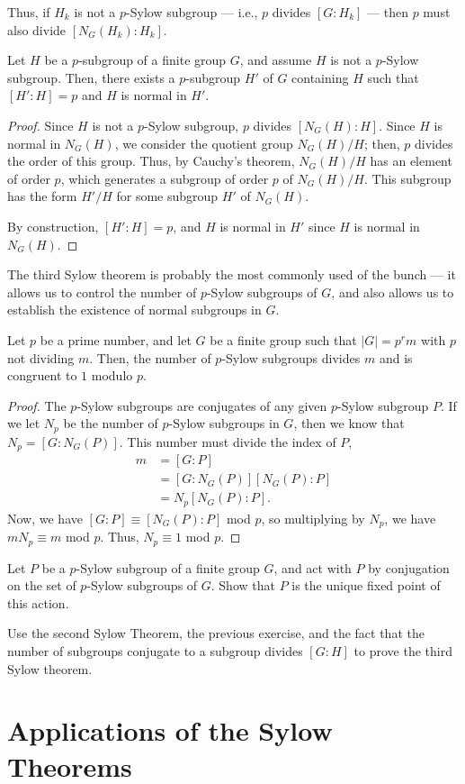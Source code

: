 \documentclass[10pt]{mypackage}
\begin{document}
Thus, if $H_k$ is not a $p$-Sylow subgroup --- i.e., $p$ divides $\left[ G:H_k \right]$ --- then $p$ must also divide $\left[ N_G\left(H_k\right) : H_k \right]$.
\begin{proposition}
  Let $H$ be a $p$-subgroup of a finite group $G$, and assume $H$ is not a $p$-Sylow subgroup. Then, there exists a $p$-subgroup $H'$ of $G$ containing $H$ such that $\left[ H':H \right] = p$ and $H$ is normal in $H'$.
\end{proposition}
\begin{proof}
  Since $H$ is not a $p$-Sylow subgroup, $p$ divides $\left[ N_G(H):H \right]$. Since $H$ is normal in $N_G(H)$, we consider the quotient group $N_G(H)/H$; then, $p$ divides the order of this group. Thus, by Cauchy's theorem, $N_G(H)/H$ has an element of order $p$, which generates a subgroup of order $p$ of $N_G(H)/H$. This subgroup has the form $H'/H$ for some subgroup $H'$ of $N_G(H)$.\newline

  By construction, $\left[ H':H \right] = p$, and $H$ is normal in $H'$ since $H$ is normal in $N_G(H)$.
\end{proof}
The third Sylow theorem is probably the most commonly used of the bunch --- it allows us to control the number of $p$-Sylow subgroups of $G$, and also allows us to establish the existence of normal subgroups in $G$.
\begin{theorem}
  Let $p$ be a prime number, and let $G$ be a finite group such that $\left\vert G \right\vert = p^{r} m$ with $p$ not dividing $m$. Then, the number of $p$-Sylow subgroups divides $m$ and is congruent to $1$ modulo $p$.
\end{theorem}
\begin{proof}
  The $p$-Sylow subgroups are conjugates of any given $p$-Sylow subgroup $P$. If we let $N_p$ be the number of $p$-Sylow subgroups in $G$, then we know that $N_p = \left[ G:N_G(P) \right]$. This number must divide the index of $P$,
  \begin{align*}
    m &= \left[ G:P \right]\\
      &= \left[ G:N_G(P) \right]\left[ N_G(P):P \right]\\
      &= N_p\left[ N_G(P):P \right].
  \end{align*}
  Now, we have $\left[ G:P \right]\equiv \left[ N_G(P):P \right]$ mod $p$, so multiplying by $N_p$, we have $mN_p \equiv m$ mod $p$. Thus, $N_p\equiv 1$ mod $p$.
\end{proof}
\begin{exercise}
  Let $P$ be a $p$-Sylow subgroup of a finite group $G$, and act with $P$ by conjugation on the set of $p$-Sylow subgroups of $G$. Show that $P$ is the unique fixed point of this action.
\end{exercise}
\begin{exercise}
  Use the second Sylow Theorem, the previous exercise, and the fact that the number of subgroups conjugate to a subgroup divides $\left[ G:H \right]$ to prove the third Sylow theorem.
\end{exercise}

\section{Applications of the Sylow Theorems}%
\end{document}
